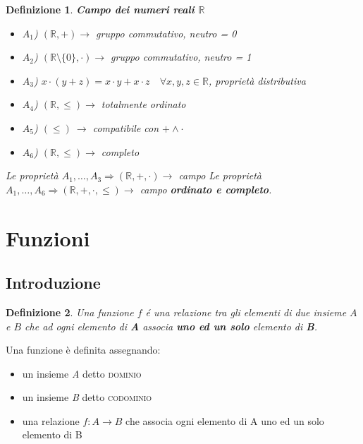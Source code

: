 \documentclass[12pt, a4paper]{article}
\theoremstyle{break}
\newtheorem{defn}{Definizione}
\theoremstyle{lemma}
\theoremstyle{lemma}
\theoremstyle{lemma}
\begin{document}
\begin{defn} \textbf{Campo dei numeri reali $\mathbb{R} $}
	
	\begin{itemize}
		\item $A_1$) $(\mathbb{R}, +) \rightarrow$ gruppo commutativo, neutro = 0
		\item $A_2$) $(\mathbb{R} \setminus \{ 0 \} , \cdot) \rightarrow$  gruppo commutativo, neutro = 1
		\item $A_3$) $ x \cdot (y+z) = x \cdot y+x \cdot z \quad \forall x,y,z \in \mathbb{R}$, proprietà distributiva
		\item $A_4$) $(\mathbb{R}, \leq ) \rightarrow $ totalmente ordinato
		\item $A_5$) $ (\leq )\ \rightarrow $ compatibile con $ + \land \cdot $
		\item $A_6$) $(\mathbb{R}, \leq ) \rightarrow $ completo 

	\end{itemize}
	Le proprietà $ A_1, \dots , A_3 \Longrightarrow (\mathbb{R}, +, \cdot) \rightarrow $ campo \newline
	Le proprietà $ A_1, \dots , A_6 \Longrightarrow (\mathbb{R}, +, \cdot, \leq) \rightarrow $ campo \textbf{ordinato e completo}.

\end{defn}



\section{Funzioni}

\subsection{Introduzione}

\begin{defn}
Una funzione $f$ é una relazione tra gli elementi di due insieme $A$ e $B$ che ad ogni elemento di \textbf{A} associa \textbf{uno ed un solo} elemento di \textbf{B}.
\end{defn}


Una funzione è definita assegnando:
\begin{itemize}
\item un insieme \textit{A} detto  \textsc{dominio}
\item un insieme \textit{B} detto \textsc{codominio}
\item una relazione $f: A \rightarrow B$ che associa ogni elemento di A uno ed un solo elemento di B
\end{itemize}
\end{document}
